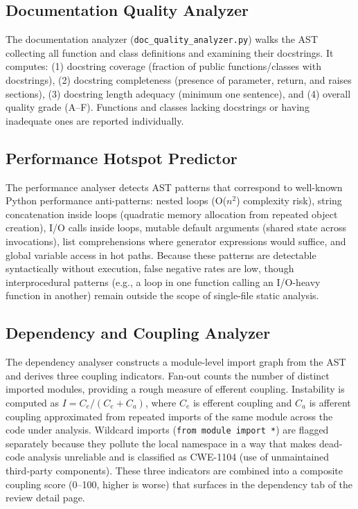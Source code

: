 \documentclass[12pt, oneside]{report}
\begin{document}
\subsection{Documentation Quality Analyzer}
\label{ssec:docs}

The documentation analyzer (\texttt{doc\_quality\_analyzer.py}) walks the AST collecting
all function and class definitions and examining their docstrings. It computes:
(1) docstring coverage (fraction of public functions/classes with docstrings),
(2) docstring completeness (presence of parameter, return, and raises sections),
(3) docstring length adequacy (minimum one sentence), and (4) overall quality grade (A--F).
Functions and classes lacking docstrings or having inadequate ones are reported individually.

\subsection{Performance Hotspot Predictor}
\label{ssec:performance}

The performance analyser detects AST patterns that correspond to well-known Python
performance anti-patterns: nested loops (O($n^2$) complexity risk), string
concatenation inside loops (quadratic memory allocation from repeated object
creation), I/O calls inside loops, mutable default arguments (shared state across
invocations), list comprehensions where generator expressions would suffice, and
global variable access in hot paths. Because these patterns are detectable
syntactically without execution, false negative rates are low, though interprocedural
patterns (e.g., a loop in one function calling an I/O-heavy function in another)
remain outside the scope of single-file static analysis.

\subsection{Dependency and Coupling Analyzer}
\label{ssec:dependency}

The dependency analyser constructs a module-level import graph from the AST and
derives three coupling indicators. Fan-out counts the number of distinct imported
modules, providing a rough measure of efferent coupling. Instability is computed as
$I = C_e / (C_e + C_a)$, where $C_e$ is efferent coupling and $C_a$ is afferent
coupling approximated from repeated imports of the same module across the code
under analysis. Wildcard imports (\texttt{from~module~import~*}) are flagged
separately because they pollute the local namespace in a way that makes dead-code
analysis unreliable and is classified as CWE-1104 (use of unmaintained third-party
components). These three indicators are combined into a composite coupling score
(0--100, higher is worse) that surfaces in the dependency tab of the review detail
page.
\end{document}
